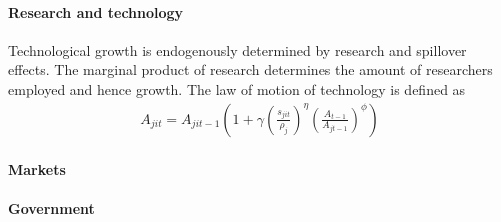 \paragraph{Research and technology}
Technological growth is endogenously determined by research and spillover effects. The marginal product of research determines the amount of researchers employed and hence growth. 
The law of motion of technology is defined as
\begin{align}
A_{jit}=A_{jit-1}\left(1+\gamma\left(\frac{s_{jit}}{\rho_j}\right)^\eta\left(\frac{A_{t-1}}{A_{jt-1}}\right)^\phi\right)
\end{align}

\begin{comment}
\paragraph{Impossibility of reaching target in laissez-faire with exogenous growth}
\tr{Note that this is wrong! There is an option for the gov to affect inflation which then redirects demand.}
Note that with exogenous growth in each sector there is no possibility for the government to stop emissions from growing, since production of the dirty good is essential for the consumption good (no perfect substitution: $\varepsilon<\infty$). To meet the emission target, the government either needs to affect the growth rate in the economy; i.e., $\upsilon_j$ is a choice variable, or work and consumption need to be set to zero; or the emission target has to be defined in relative terms. The latter possibility contradicts the Paris Agreement which is concerned with absolute emissions.  
I therefore assume, that the government can change the growth rate.

The government chooses the growth rate in each sector, taking into account that research is constrained by an exogenous  amount of scientists
\begin{align}
\upsilon_{ct}+\upsilon_{dt}\leq\Upsilon
\end{align}
\end{comment} 
  
\paragraph{Markets}
  
\paragraph{Government}

